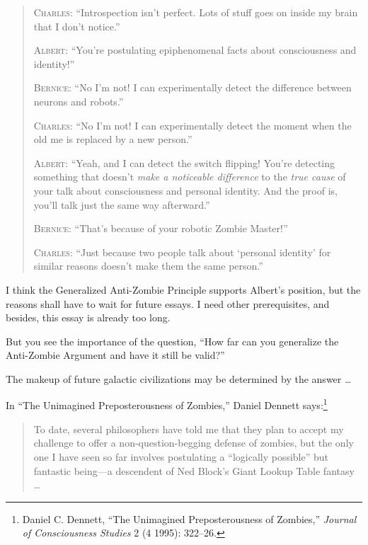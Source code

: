 \begin{quotation}
{
 \textsc{Charles}: ``Introspection isn't
perfect. Lots of stuff goes on inside my brain that I
don't notice.''}

{
 \textsc{Albert}: ``You're postulating
epiphenomenal facts about consciousness and
identity!''}

{
 \textsc{Bernice}: ``No I'm not! I can
experimentally detect the difference between neurons and
robots.''}

{
 \textsc{Charles}: ``No I'm not! I can
experimentally detect the moment when the old me is replaced by a new
person.''}

{
 \textsc{Albert}: ``Yeah, and I can detect the switch
flipping! You're detecting something that
doesn't \textit{make a noticeable difference} to the
\textit{true cause} of your talk about consciousness and personal
identity. And the proof is, you'll talk just the same
way afterward.''}

{
 \textsc{Bernice}: ``That's because of your
robotic Zombie Master!''}

{
 \textsc{Charles}: ``Just because two people talk about
`personal identity' for similar reasons
 doesn't make them the same person.''}
\end{quotation}

{
 I think the Generalized Anti-Zombie Principle supports
Albert's position, but the reasons shall have to wait
for future essays. I need other prerequisites, and besides, this essay
is already too long.}

{
 But you see the importance of the question, ``How
far can you generalize the Anti-Zombie Argument and have it still be
valid?''}

{
 The makeup of future galactic civilizations may be determined by
the answer \ldots}

\myendsectiontext


\bigskip


{
 In ``The Unimagined Preposterousness of
Zombies,'' Daniel Dennett says:\footnote{Daniel C. Dennett, ``The Unimagined
Preposterousness of Zombies,'' \textit{Journal of
Consciousness Studies} 2 (4 1995): 322--26.}}

\begin{quote}
{
 To date, several philosophers have told me that they plan to
accept my challenge to offer a non-question-begging defense of zombies,
but the only one I have seen so far involves postulating a
``logically possible'' but fantastic
being---a descendent of Ned Block's Giant Lookup Table
fantasy \ldots}
\end{quote}

